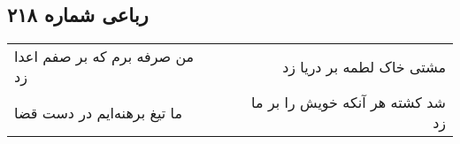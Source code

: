 \begin{center}
\section*{رباعی شماره ۲۱۸}
\label{sec:sh218}
\begin{longtable}{l p{0.5cm} r}
من صرفه برم که بر صفم اعدا زد
&&
مشتی خاک لطمه بر دریا زد
\\
ما تیغ برهنه‌ایم در دست قضا
&&
شد کشته هر آنکه خویش را بر ما زد
\\
\end{longtable}
\end{center}
